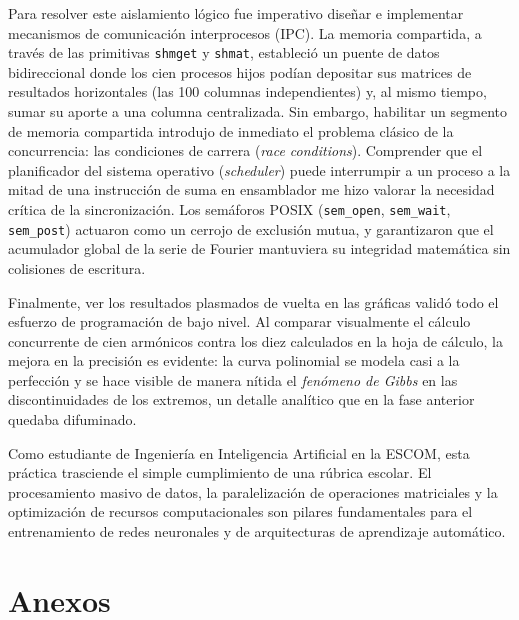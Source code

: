 Para resolver este aislamiento lógico fue imperativo diseñar e implementar mecanismos de comunicación interprocesos (IPC). La memoria compartida, a través de las primitivas \texttt{shmget} y \texttt{shmat}, estableció un puente de datos bidireccional donde los cien procesos hijos podían depositar sus matrices de resultados horizontales (las 100 columnas independientes) y, al mismo tiempo, sumar su aporte a una columna centralizada. Sin embargo, habilitar un segmento de memoria compartida introdujo de inmediato el problema clásico de la concurrencia: las condiciones de carrera (\textit{race conditions}). Comprender que el planificador del sistema operativo (\textit{scheduler}) puede interrumpir a un proceso a la mitad de una instrucción de suma en ensamblador me hizo valorar la necesidad crítica de la sincronización. Los semáforos POSIX (\texttt{sem\_open}, \texttt{sem\_wait}, \texttt{sem\_post}) actuaron como un cerrojo de exclusión mutua, y garantizaron que el acumulador global de la serie de Fourier mantuviera su integridad matemática sin colisiones de escritura.

Finalmente, ver los resultados plasmados de vuelta en las gráficas validó todo el esfuerzo de programación de bajo nivel. Al comparar visualmente el cálculo concurrente de cien armónicos contra los diez calculados en la hoja de cálculo, la mejora en la precisión es evidente: la curva polinomial se modela casi a la perfección y se hace visible de manera nítida el \textit{fenómeno de Gibbs} en las discontinuidades de los extremos, un detalle analítico que en la fase anterior quedaba difuminado.

Como estudiante de Ingeniería en Inteligencia Artificial en la ESCOM, esta práctica trasciende el simple cumplimiento de una rúbrica escolar. El procesamiento masivo de datos, la paralelización de operaciones matriciales y la optimización de recursos computacionales son pilares fundamentales para el entrenamiento de redes neuronales y de arquitecturas de aprendizaje automático.


\section{Anexos}
\label{sec:cap03:anexos}

